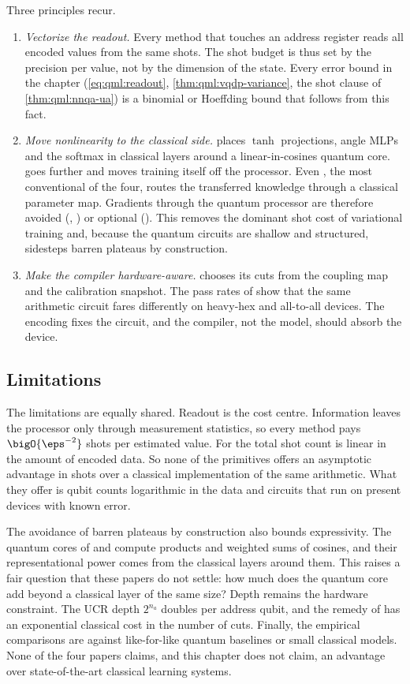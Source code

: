 Three principles recur.
\begin{enumerate}
\item \emph{Vectorize the readout.} Every method that touches an address register reads all encoded values from the same shots. The shot budget is thus set by the precision per value, not by the dimension of the state. Every error bound in the chapter (\cref{eq:qml:readout}, \cref{thm:qml:vqdp-variance}, the shot clause of \cref{thm:qml:nnqa-ua}) is a binomial or Hoeffding bound that follows from this fact.
\item \emph{Move nonlinearity to the classical side.} \vqt{} places $\tanh$ projections, angle MLPs and the softmax in classical layers around a linear-in-cosines quantum core. \nnqa{} goes further and moves training itself off the processor. Even \qpie{}, the most conventional of the four, routes the transferred knowledge through a classical parameter map. Gradients through the quantum processor are therefore avoided (\vqt{}, \nnqa{}) or optional (\qpie{}). This removes the dominant shot cost of variational training and, because the quantum circuits are shallow and structured, sidesteps barren plateaus by construction.
\item \emph{Make the compiler hardware-aware.} \shardq{} chooses its cuts from the coupling map and the calibration snapshot. The pass rates of \nnqa{} show that the same arithmetic circuit fares differently on heavy-hex and all-to-all devices. The encoding fixes the circuit, and the compiler, not the model, should absorb the device.
\end{enumerate}

\subsection{Limitations}\label{sec:qml:synthesis:limitations}

The limitations are equally shared. Readout is the cost centre. Information leaves the processor only through measurement statistics, so every method pays $\bigO{\eps^{-2}}$ shots per estimated value. For \vqt{} the total shot count is linear in the amount of encoded data. So none of the primitives offers an asymptotic advantage in shots over a classical implementation of the same arithmetic. What they offer is qubit counts logarithmic in the data and circuits that run on present devices with known error.

The avoidance of barren plateaus by construction also bounds expressivity. The quantum cores of \vqt{} and \nnqa{} compute products and weighted sums of cosines, and their representational power comes from the classical layers around them. This raises a fair question that these papers do not settle: how much does the quantum core add beyond a classical layer of the same size? Depth remains the hardware constraint. The UCR depth $2^{n_a}$ doubles per address qubit, and the remedy of \shardq{} has an exponential classical cost in the number of cuts. Finally, the empirical comparisons are against like-for-like quantum baselines or small classical models. None of the four papers claims, and this chapter does not claim, an advantage over state-of-the-art classical learning systems.

